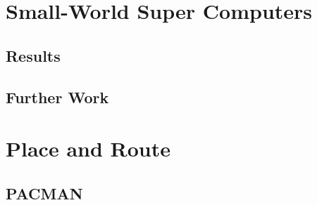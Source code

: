 	\section{Small-World Super Computers}
		
		\subsection{Results}
		
		\subsection{Further Work}
	
	\section{Place and Route}
		
		\subsection{PACMAN}



